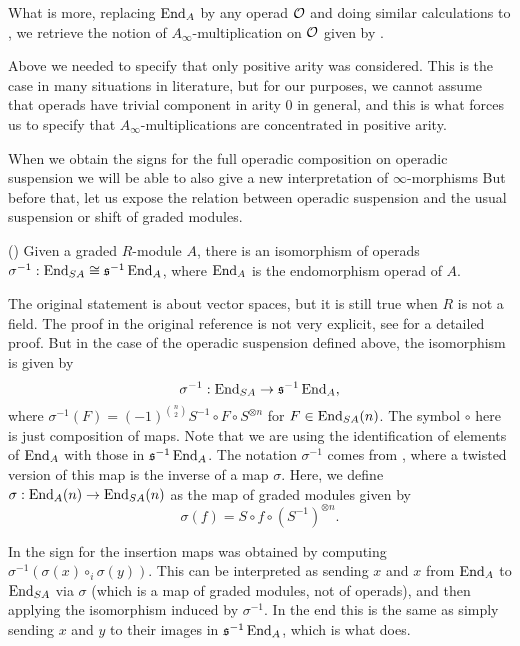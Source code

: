 \documentclass[Thesis.tex]{subfiles}
\begin{document}
What is more, replacing $\operatorname{End}_A$ by any operad ${\mathcal O}$ and doing similar calculations to \cite[Proposition 10.1.11]{lodayvallette}, we retrieve the notion of $A_\infty$-multiplication on ${\mathcal O}$ given by .

\begin{remark}
Above we needed to specify that only positive arity was considered. This is the case in many situations in literature, but for our purposes, we cannot assume that operads have trivial component in arity 0 in general, and this is what forces us to specify that $A_\infty$-multiplications are concentrated in positive arity.
\end{remark}

When we obtain the signs for the full operadic composition on operadic suspension we will be able to also give a new interpretation of $\infty$-morphisms %
But before that, let us expose the relation between operadic suspension and the usual suspension or shift of graded modules.

\begin{thm}\label{markl}(\cite[Chapter 3, Lemma 3.16]{operads})
Given a graded $R$-module $A$, there is an isomorphism of operads $\sigma^{-1}:\operatorname{End}_{S A}\cong \mathfrak{s}^{-1}\operatorname{End}_A$, where $\operatorname{End}_A$ is the endomorphism operad of $A$.
\end{thm}
The original statement is about vector spaces, but it is still true when $R$ is not a field. The proof in the original reference is not very explicit, see   for a detailed proof. But in the case of the operadic suspension defined above, the isomorphism is given by \[\sigma^{-1}:\operatorname{End}_{S A}\to\mathfrak{s}^{-1}\operatorname{End}_A,\] where $\sigma^{-1}(F)=(-1)^{\binom{n}{2}}S^{-1}\circ F\circ S^{\otimes n}$ for $F\in \operatorname{End}_{S A}(n)$. The symbol $\circ$ here is just composition of maps.
Note that we are using the identification of elements of $\operatorname{End}_A$ with those in $\mathfrak{s}^{-1}\operatorname{End}_A$. The notation $\sigma^{-1}$ comes from \cite{RW}, where a twisted version of this map is the inverse of a map $\sigma$. Here, we define $\sigma:\operatorname{End}_A(n)\to\operatorname{End}_{SA}(n)$ as the map of graded modules given by
\begin{equation}\label{sigma}
\sigma(f)= S\circ f \circ (S^{-1})^{\otimes n}.
\end{equation}

In \cite{RW} the sign for the insertion maps was obtained by computing $\sigma^{-1}(\sigma(x)\circ_i\sigma(y))$. This can be interpreted as sending $x$ and $x$ from $\operatorname{End}_A$ to $\operatorname{End}_{S A}$ via $\sigma$ (which is a map of graded modules, not of operads), and then applying the isomorphism induced by $\sigma^{-1}$. In the end this is the same as simply sending $x$ and $y$ to their images in $\mathfrak{s}^{-1}\operatorname{End}_A$, which is what  does.
\end{document}
